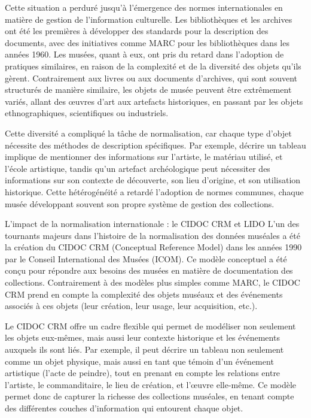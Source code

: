 Cette situation a perduré jusqu’à l’émergence des normes internationales en matière de gestion de l’information culturelle. Les bibliothèques et les archives ont été les premières à développer des standards pour la description des documents, avec des initiatives comme MARC pour les bibliothèques dans les années 1960. Les musées, quant à eux, ont pris du retard dans l’adoption de pratiques similaires, en raison de la complexité et de la diversité des objets qu’ils gèrent. Contrairement aux livres ou aux documents d’archives, qui sont souvent structurés de manière similaire, les objets de musée peuvent être extrêmement variés, allant des œuvres d’art aux artefacts historiques, en passant par les objets ethnographiques, scientifiques ou industriels.\newline

Cette diversité a compliqué la tâche de normalisation, car chaque type d’objet nécessite des méthodes de description spécifiques. Par exemple, décrire un tableau implique de mentionner des informations sur l’artiste, le matériau utilisé, et l’école artistique, tandis qu’un artefact archéologique peut nécessiter des informations sur son contexte de découverte, son lieu d’origine, et son utilisation historique. Cette hétérogénéité a retardé l’adoption de normes communes, chaque musée développant souvent son propre système de gestion des collections.\newline

L'impact de la normalisation internationale : le CIDOC CRM et LIDO
L’un des tournants majeurs dans l’histoire de la normalisation des données muséales a été la création du CIDOC CRM (Conceptual Reference Model) dans les années 1990 par le Conseil International des Musées (ICOM). Ce modèle conceptuel a été conçu pour répondre aux besoins des musées en matière de documentation des collections. Contrairement à des modèles plus simples comme MARC, le CIDOC CRM prend en compte la complexité des objets muséaux et des événements associés à ces objets (leur création, leur usage, leur acquisition, etc.).\newline

Le CIDOC CRM offre un cadre flexible qui permet de modéliser non seulement les objets eux-mêmes, mais aussi leur contexte historique et les événements auxquels ils sont liés. Par exemple, il peut décrire un tableau non seulement comme un objet physique, mais aussi en tant que témoin d’un événement artistique (l’acte de peindre), tout en prenant en compte les relations entre l’artiste, le commanditaire, le lieu de création, et l’œuvre elle-même. Ce modèle permet donc de capturer la richesse des collections muséales, en tenant compte des différentes couches d’information qui entourent chaque objet. \newline

